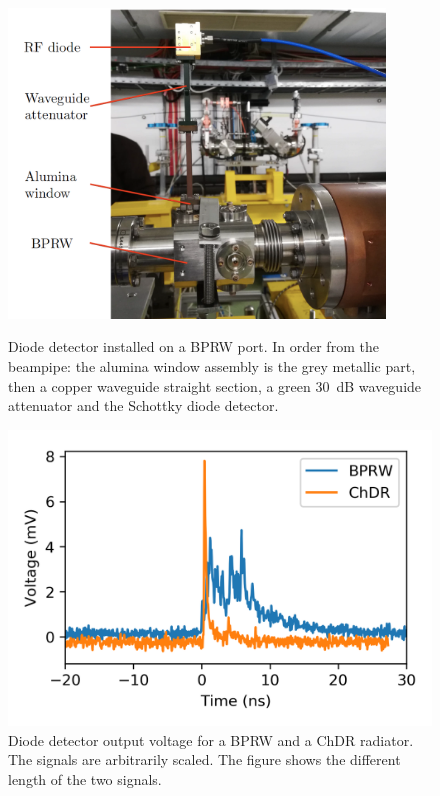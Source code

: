 \begin{figure}[!t]
\centering
\includegraphics[width=10cm, keepaspectratio]{pictures/BPRW_diode_caption}
\caption{Diode detector installed on a BPRW port. In order from the beampipe: the alumina window assembly is the grey metallic part, then a copper waveguide straight section, a green 30~dB waveguide attenuator and the Schottky diode detector.}
\label{fig:bprw}

\vspace{5mm}

\includegraphics[scale=1,keepaspectratio]{pictures/bprw_vs_chdr}
\caption{Diode detector output voltage for a BPRW and a ChDR radiator. The signals are arbitrarily scaled. The figure shows the different length of the two signals.}
\label{fig:bprw_vs_chdr}
\end{figure}








